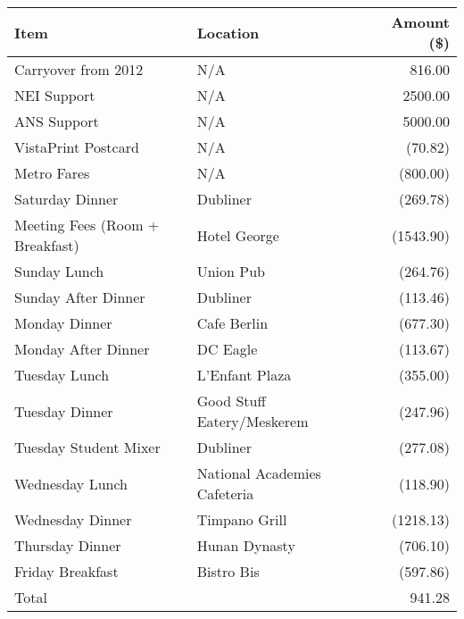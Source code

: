 \begin{center}
\begin{tabular}{llr}
\toprule
Item                            & Location                     & Amount (\$) \\
\midrule
Carryover from 2012             & N/A                          & 816.00  \\
NEI Support                     & N/A                          & 2500.00 \\
ANS Support                     & N/A                          & 5000.00 \\ 
VistaPrint Postcard             & N/A                          & (70.82) \\
Metro Fares                     & N/A                          & (800.00) \\
Saturday Dinner                 & Dubliner                     & (269.78) \\
Meeting Fees (Room + Breakfast) & Hotel George                 & (1543.90) \\
Sunday Lunch                    & Union Pub                    & (264.76) \\
Sunday After Dinner             & Dubliner                     & (113.46) \\
Monday Dinner                   & Cafe Berlin                  & (677.30) \\
Monday After Dinner             & DC Eagle                     & (113.67) \\
Tuesday Lunch                   & L'Enfant Plaza               & (355.00) \\
Tuesday Dinner                  & Good Stuff Eatery/Meskerem   & (247.96) \\
Tuesday Student Mixer           & Dubliner                     & (277.08) \\
Wednesday Lunch                 & National Academies Cafeteria & (118.90) \\
Wednesday Dinner                & Timpano Grill                & (1218.13) \\
Thursday Dinner                 & Hunan Dynasty                & (706.10) \\
Friday Breakfast                & Bistro Bis                   & (597.86) \\
\bottomrule                
Total                           &                              & 941.28 \footnotemark
\end{tabular}
\end{center}

